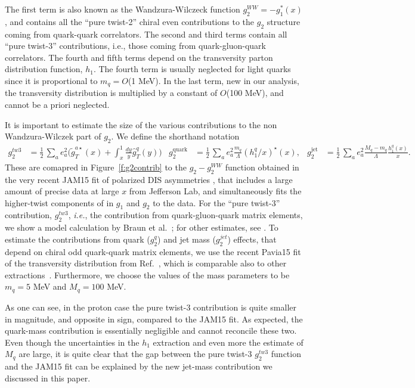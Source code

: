 \documentclass[preprintnumbers,floatfix,nofootinbib]{revtex4}
\newcommand{\mj}{M_q}
\newcommand{\mq}{m_q}
\begin{document}
The first term is also known as the Wandzura-Wilczeck function $g_2^{WW} =
-g_1^*(x)$ , and contains all the ``pure twist-2'' chiral even contributions to
the $g_2$ structure coming from quark-quark correlators. The second and third
terms contain all ``pure twist-3'' contributions, i.e., those coming from
quark-gluon-quark correlators. The fourth and fifth terms depend on the
transversity parton distribution function, $h_1$. 
The fourth term is usually neglected for
light quarks since it is proportional to $\mq=O$(1 MeV). In the last term,
new in our analysis, the transversity distribution is multiplied by a constant
of $O$(100 MeV), and cannot be a priori neglected.

It is important to estimate the size of the various contributions to the non Wandzura-Wilczek part of $g_2$. We define the shorthand notation
\begin{align}
g_2^{tw3} & = \frac{1}{2}\,\sum_a e_a^2
    \biggl(
    \widetilde g_T^{a \star}(x) 
    + \int_x^1\frac{dy}{y} \widehat{g}_T^q(y) 
    \biggr) 
&
g_2^{\text{quark}} &= \frac{1}{2}\,\sum_a e_a^2 
 \frac{\mq}{\Lambda} (h_1^q/x)^\star(x),
&
g_2^{\text{jet}} &= \frac{1}{2}\,\sum_a e_a^2 
\frac{\mj-\mq}{\Lambda} \frac{h_1^q(x)}{x}. 
\end{align} 
These are comapred in Figure~\ref{f:g2contrib} to the $g_2-g_2^{WW}$ function
obtained in the very recent JAM15 fit of polarized DIS asymmetries
\cite{Sato:2016tuz}, that includes a large amount of precise data at large $x$
from Jefferson Lab, and simultaneously fits the higher-twist components of in
$g_1$ and $g_2$ to the data. For the ``pure twist-3'' contribution,
$g_2^{tw3}$, {\it i.e.}, the contribution from quark-gluon-quark matrix
elements, we show a model calculation by Braun et al.~\cite{Braun:2011aw}; for
other estimates, see \cite{Other-tw3-calcs}. To estimate the contributions
from quark ($g_2^q$) and jet mass ($g_2^{jet}$) effects, that depend on chiral
odd quark-quark matrix elements, we use the recent Pavia15 fit of the
transversity distribution from Ref.~\cite{Radici:2015mwa}, which is comparable
also to other 
extractions~\cite{Anselmino:2013vqa,Kang:2015msa}. Furthermore, we choose the
values of the mass parameters to be $\mq=5$ MeV and $\mj = 100$ MeV. 

As one can see, in the proton case the pure twist-3 contribution is quite
smaller in magnitude, and opposite in sign, compared to the JAM15 fit. As
expected, the quark-mass contribution is essentially negligible and cannot
reconcile these two. Even though the uncertainties in the $h_1$ extraction and
even more the estimate of $M_q$ are large, it is quite clear that the gap
between the pure twist-3 $g_2^{tw3}$ function and the JAM15 fit can be
explained by the new jet-mass contribution we discussed in this paper.  
\end{document}
